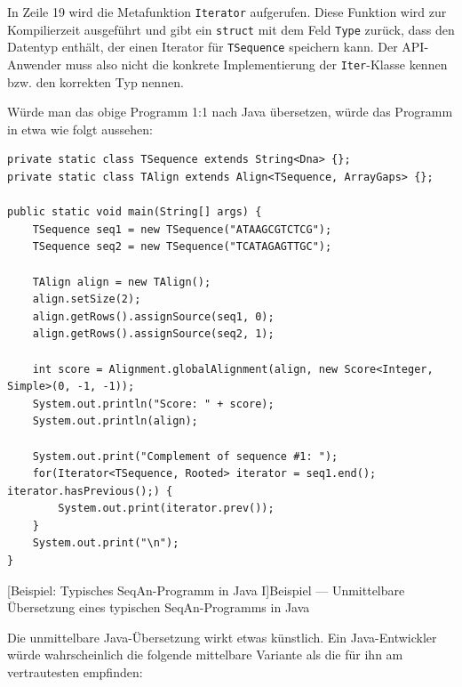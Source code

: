 \documentclass[11pt,a4paper]{book}
\begin{document}
\begin{center}
{In Zeile 19 wird die Metafunktion \texttt{Iterator} aufgerufen. Diese Funktion wird zur Kompilierzeit ausgeführt und gibt ein \texttt{struct} mit dem Feld \texttt{Type} zurück, dass den Datentyp enthält, der einen Iterator für \texttt{TSequence} speichern kann. Der API-Anwender muss also nicht die konkrete Implementierung der \texttt{Iter}-Klasse kennen bzw. den korrekten Typ nennen.}
\label{lst:seqan-typical}
\end{center}

\bigskip

Würde man das obige Programm 1:1 nach Java übersetzen, würde das Programm in etwa wie folgt aussehen:

\begin{center}
\begin{verbatim}
private static class TSequence extends String<Dna> {};
private static class TAlign extends Align<TSequence, ArrayGaps> {};

public static void main(String[] args) {
    TSequence seq1 = new TSequence("ATAAGCGTCTCG");
    TSequence seq2 = new TSequence("TCATAGAGTTGC");

    TAlign align = new TAlign();
    align.setSize(2);
    align.getRows().assignSource(seq1, 0);
    align.getRows().assignSource(seq2, 1);

    int score = Alignment.globalAlignment(align, new Score<Integer, Simple>(0, -1, -1));
    System.out.println("Score: " + score);
    System.out.println(align);

    System.out.print("Complement of sequence #1: ");
    for(Iterator<TSequence, Rooted> iterator = seq1.end(); iterator.hasPrevious();) {
        System.out.print(iterator.prev());
    }
    System.out.print("\n");
}
\end{verbatim}
[Beispiel: Typisches SeqAn-Programm in Java I]{Beispiel --- Unmittelbare Übersetzung eines typischen SeqAn-Programms in Java}
\label{lst:seqan-typical-java1}
\end{center}

\bigskip

Die unmittelbare Java-Übersetzung wirkt etwas künstlich. Ein Java-Entwickler würde wahrscheinlich die folgende mittelbare Variante als die für ihn am vertrautesten empfinden:
\end{document}
